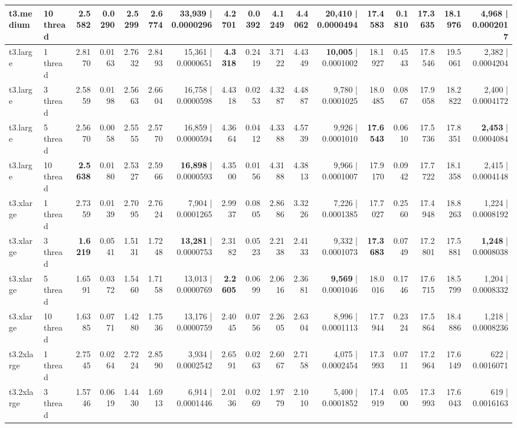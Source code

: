 \documentclass[conference]{IEEEtran}
\begin{document}
\begin{table}[h]
{\begin{tabular}{ll|rrrrr|rrrrr|rrrrr}
				t3.medium & 10 thread & 2.5582 & 0.0290 & 2.5299 & 2.6774 & 33,939 | 0.0000296 & \textbf{4.2701} & 0.0392 & 4.1249 & 4.4062 & \textbf{20,410} | 0.0000494 & \textbf{17.4583} & 0.1810 & 17.3635 & 18.1976 & \textbf{4,968} | 0.0002017 \\
				\midrule
				t3.large & 1 thread & 2.8170 & 0.0163 & 2.7632 & 2.8493 & 15,361 | 0.0000651 & \textbf{4.3318} & 0.2419 & 3.7122 & 4.4349 & \textbf{10,005} | 0.0001002 & 18.1927 & 0.4543 & 17.8546 & 19.5061 & 2,382 | 0.0004204 \\
				t3.large & 3 thread & 2.5859 & 0.0198 & 2.5663 & 2.6604 & 16,758 | 0.0000598 & 4.4318 & 0.0253 & 4.3287 & 4.4887 & 9,780 | 0.0001025 & 18.0485 & 0.0867 & 17.9058 & 18.2822 & 2,400 | 0.0004172 \\
				t3.large & 5 thread & 2.5670 & 0.0058 & 2.5555 & 2.5770 & 16,859 | 0.0000594 & 4.3664 & 0.0412 & 4.3388 & 4.5739 & 9,926 | 0.0001010 & \textbf{17.6543} & 0.0610 & 17.5736 & 17.8351 & \textbf{2,453} | 0.0004084 \\
				t3.large & 10 thread & \textbf{2.5638} & 0.0180 & 2.5327 & 2.5966 & \textbf{16,898} | 0.0000593 & 4.3500 & 0.0156 & 4.3188 & 4.3813 & 9,966 | 0.0001007 & 17.9170 & 0.0942 & 17.7722 & 18.1358 & 2,415 | 0.0004148 \\
				\midrule
				t3.xlarge & 1 thread & 2.7359 & 0.0139 & 2.7095 & 2.7624 & 7,904 | 0.0001265 & 2.9937 & 0.0805 & 2.8686 & 3.3226 & 7,226 | 0.0001385 & 17.7027 & 0.2560 & 17.4948 & 18.8263 & 1,224 | 0.0008192 \\
				t3.xlarge & 3 thread & \textbf{1.6219} & 0.0541 & 1.5131 & 1.7248 & \textbf{13,281} | 0.0000753 & 2.3182 & 0.0523 & 2.2138 & 2.4133 & 9,332 | 0.0001073 & \textbf{17.3683} & 0.0749 & 17.2801 & 17.5881 & \textbf{1,248} | 0.0008038 \\
				t3.xlarge & 5 thread & 1.6591 & 0.0372 & 1.5460 & 1.7158 & 13,013 | 0.0000769 & \textbf{2.2605} & 0.0699 & 2.0616 & 2.3681 & \textbf{9,569} | 0.0001046 & 18.0016 & 0.1746 & 17.6715 & 18.5799 & 1,204 | 0.0008332 \\
				t3.xlarge & 10 thread & 1.6385 & 0.0771 & 1.4280 & 1.7536 & 13,176 | 0.0000759 & 2.4045 & 0.0756 & 2.2605 & 2.6304 & 8,996 | 0.0001113 & 17.7944 & 0.2324 & 17.5864 & 18.4886 & 1,218 | 0.0008236 \\
				\midrule
				t3.2xlarge & 1 thread & 2.7545 & 0.0264 & 2.7224 & 2.8590 & 3,934 | 0.0002542 & 2.6591 & 0.0263 & 2.6067 & 2.7158 & 4,075 | 0.0002454 & 17.3993 & 0.0711 & 17.2964 & 17.6149 & 622 | 0.0016071 \\
				t3.2xlarge & 3 thread & 1.5746 & 0.0619 & 1.4430 & 1.6913 & 6,914 | 0.0001446 & 2.0136 & 0.0269 & 1.9779 & 2.1010 & 5,400 | 0.0001852 & 17.4919 & 0.0500 & 17.3993 & 17.6043 & 619 | 0.0016163 \\

\end{tabular}}
\end{table}
\end{document}
